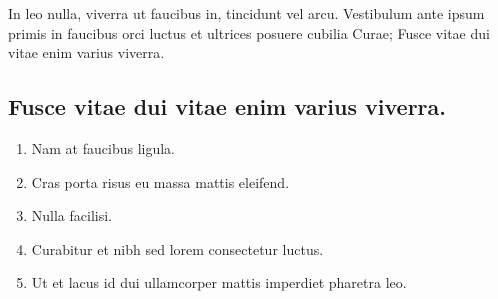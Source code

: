 \documentclass[10pt,landscape]{cheatsheet}
\begin{document}
\begin{multicols}{3}
In leo nulla, viverra ut faucibus in, tincidunt
vel arcu. Vestibulum ante ipsum primis in faucibus orci luctus et ultrices
posuere cubilia Curae; Fusce vitae dui vitae enim varius viverra.

\subsection{Fusce vitae dui vitae enim varius viverra.}
\begin{enumerate}
\item Nam at faucibus ligula.
\item Cras porta risus eu massa mattis eleifend.
\item Nulla facilisi.
\item Curabitur et nibh sed lorem consectetur luctus.
\item Ut et lacus id dui ullamcorper mattis imperdiet pharetra leo.
\end{enumerate}

\end{multicols}
\end{document}
